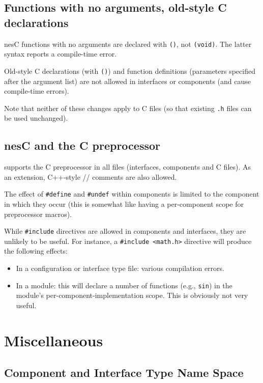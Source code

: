 \documentclass[11pt]{article}
\newcommand{\kw}[1]{{\tt #1}}
\newcommand{\code}[1]{{\tt #1}}
\newcommand{\file}[1]{{\tt #1}}
\newcommand{\nesc}{nesC\xspace}
\begin{document}
\subsection{Functions with no arguments, old-style C declarations}

\nesc functions with no arguments are declared with \code{()}, not
\code{(void)}. The latter syntax reports a compile-time error.

Old-style C declarations (with \code{()}) and function definitions 
(parameters specified after the argument list) are not allowed in
interfaces or components (and cause compile-time errors).

Note that neither of these changes apply to C files (so that existing
\file{.h} files can be used unchanged).

\subsection{\nesc and the C preprocessor}

\nesC supports the C preprocessor in all files (interfaces, components and
C files). As an extension, C++-style // comments are also allowed.

The effect of \kw{\#define} and \kw{\#undef} within components is
limited to the component in which they occur (this is somewhat like
having a per-component scope for preprocessor macros).

While \kw{\#include} directives are allowed in components and interfaces,
they are unlikely to be useful. For instance, a \code{\#include <math.h>}
directive will produce the following effects:
\begin{itemize}
\item In a configuration or interface type file: various compilation errors.
\item In a module: this will declare a number of functions (e.g., \code{sin})
in the module's per-component-implementation scope. This is obviously
not very useful.
\end{itemize}

\section{Miscellaneous}
\label{sec:misc}

\subsection{Component and Interface Type Name Space}
\end{document}
